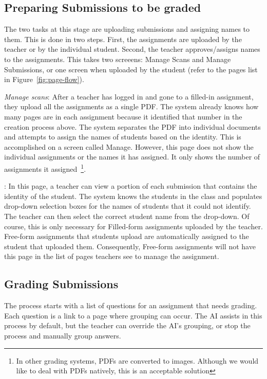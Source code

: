 \documentclass[ms,twoside,print]{nuthesis}
\begin{document}
\subsection{Preparing Submissions to be graded}

The two tasks at this stage are uploading submissions and assigning names to them. This is done in two steps. First, the assignments are uploaded by the teacher or by the individual student. Second, the teacher approves/assigns names to the assignments. This takes two screeens: Manage Scans and Manage Submissions, or one screen when uploaded by the student (refer to the pages list in Figure~\ref{fig:page-flow}).

\textit{Manage scans}: After a teacher has logged in and gone to a filled-in assignment, they upload all the assignments as a single PDF. The system already knows how many pages are in each assignment because it identified that number in the creation process above. The system separates the PDF into individual documents and attempts to assign the names of students based on the identity. This is accomplished on a screen called Manage. However, this page does not show the individual assignments or the names it has assigned. It only shows the number of assignments it assigned~\footnote{\scriptsize{In other grading systems, PDFs are converted to images. Although we would like to deal with PDFs natively, this is an acceptable solution}}. 

: In this page, a teacher can view a portion of each submission that contains the identity of the student. The system knows the students in the class and populates drop-down selection boxes for the names of students that it could not identify. The teacher can then select the correct student name from the drop-down. Of course, this is only necessary for Filled-form assignments uploaded by the teacher. Free-form assignments that students upload are automatically assigned to the student that uploaded them. Consequently, Free-form assignments will not have this page in the list of pages teachers see to manage the assignment.  

\subsection{Grading Submissions}

The process starts with a list of questions for an assignment that needs grading. Each question is a link to a page where grouping can occur. The AI assists in this process by default, but the teacher can override the AI's grouping, or stop the process and manually group answers. 
\end{document}

